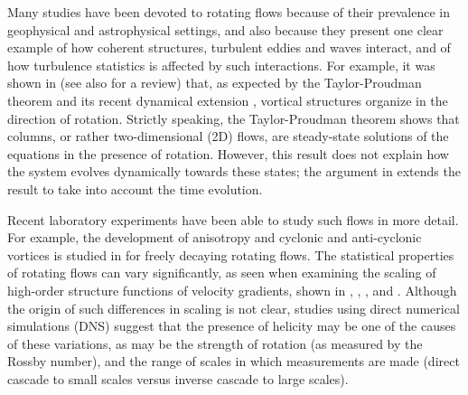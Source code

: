 \documentclass[aps,amsmath,amssymb,floatfix,showpacs]{revtex4}
\begin{document}
Many studies have been devoted to rotating flows because of their prevalence in geophysical and astrophysical settings, and also because they present one clear example of how coherent structures, turbulent eddies and waves interact, and of how turbulence statistics is affected by such interactions. For example, it was shown in \cite{hopfinger82} (see also \citealt{hopfinger93} for a review) that, as expected by the Taylor-Proudman theorem \citep{proudman, taylor} and its recent dynamical extension \citep{waleffe}, vortical structures organize in the direction of rotation. Strictly speaking, the Taylor-Proudman theorem shows that columns, or rather two-dimensional (2D) flows, are steady-state solutions of the equations in the presence of rotation. However, this result does not explain how the system evolves dynamically towards these states; the argument in \cite{waleffe} extends the result to take into account the time evolution.

Recent laboratory experiments have been able to study such flows in more detail. For example,  the development of anisotropy and cyclonic and anti-cyclonic vortices is studied in  \cite{moisy11} for freely decaying rotating flows. The statistical properties of rotating flows can vary significantly, as seen when examining the scaling of high-order structure functions of velocity gradients, shown in \cite{simand}, \cite{baroud03}, \cite{moisy}, and \cite{van}. Although the origin of such differences in scaling is not clear, studies using direct numerical simulations (DNS) suggest that the presence of helicity may be one of the causes of these variations, as may be the strength of rotation (as measured by the Rossby number), and the range of scales in which measurements are made (direct cascade to small scales versus inverse cascade to large scales).
\end{document}
